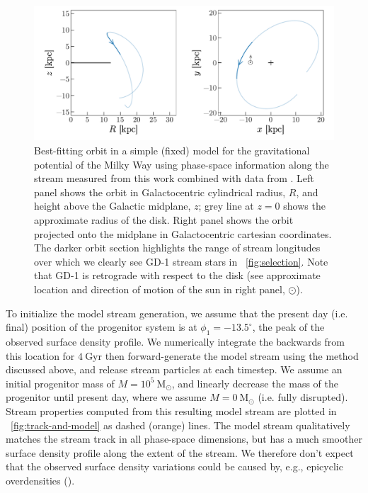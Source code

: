 \documentclass[modern]{aastex62}
\newcommand{\msun}{\textrm{M}_\odot}
\begin{document}
\begin{figure}
\begin{center}
\includegraphics[width=\textwidth]{orbitfit.pdf}
\end{center}
\caption{%
Best-fitting orbit in a simple (fixed) model for the gravitational potential of
the Milky Way using phase-space information along the stream measured from this
work combined with data from \citet{Koposov:2010}.
Left panel shows the orbit in Galactocentric cylindrical radius, $R$, and height
above the Galactic midplane, $z$;
grey line at $z=0$ shows the approximate radius of the disk.
Right panel shows the orbit projected onto the midplane in Galactocentric
cartesian coordinates.
The darker orbit section highlights the range of stream longitudes over which we
clearly see GD-1 stream stars in \figurename~\ref{fig:selection}.
Note that GD-1 is retrograde with respect to the disk (see approximate location
and direction of motion of the sun in right panel, $\odot$).
}
\label{fig:orbitfit}
\end{figure}

To initialize the model stream generation, we assume that the present day (i.e.
final) position of the progenitor system is at $\phi_1 = -13.5^\circ$, the peak
of the observed surface density profile.
We numerically integrate the backwards from this location for $4~\textrm{Gyr}$
then forward-generate the model stream using the method discussed above, and
release stream particles at each timestep.
We assume an initial progenitor mass of $M=10^5~\msun$, and linearly decrease
the mass of the progenitor until present day, where we assume $M = 0~\msun$
(i.e. fully disrupted).
Stream properties computed from this resulting model stream are plotted in
\figurename~\ref{fig:track-and-model} as dashed (orange) lines.
The model stream qualitatively matches the stream track in all phase-space
dimensions, but has a much smoother surface density profile along the extent of
the stream.
We therefore don't expect that the observed surface density variations could be
caused by, e.g., epicyclic overdensities (\citealt{Kupper:2012}).
\end{document}
